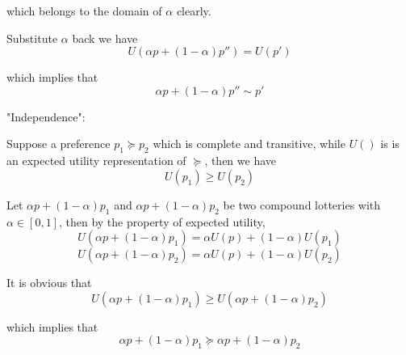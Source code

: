 \documentclass[a4paper]{article}
\begin{document}
which belongs to the domain of $\alpha$ clearly.\newline

Substitute $\alpha$ back we have
\[U(\alpha p+(1-\alpha)p'')=U(p')\]

which implies that
\[\alpha p+(1-\alpha)p'' \sim p'\]

"Independence":\newline

Suppose a preference $p_1 \succeq p_2$ which is complete and transitive, while $U()$ is is an expected utility representation of $\succeq$, then we have
\[U(p_1)\geq U(p_2)\]

Let $\alpha p+(1-\alpha)p_1$ and $\alpha p+(1-\alpha)p_2$ be two compound lotteries with $\alpha\in[0,1]$, then by the property of expected utility,
\[U(\alpha p+(1-\alpha)p_1)=\alpha U(p)+(1-\alpha)U(p_1)\]
\[U(\alpha p+(1-\alpha)p_2)=\alpha U(p)+(1-\alpha)U(p_2)\]

It is obvious that
\[U(\alpha p+(1-\alpha)p_1) \geq U(\alpha p+(1-\alpha)p_2)\]

which implies that
\[\alpha p+(1-\alpha)p_1 \succeq \alpha p+(1-\alpha)p_2\]
\end{document}
